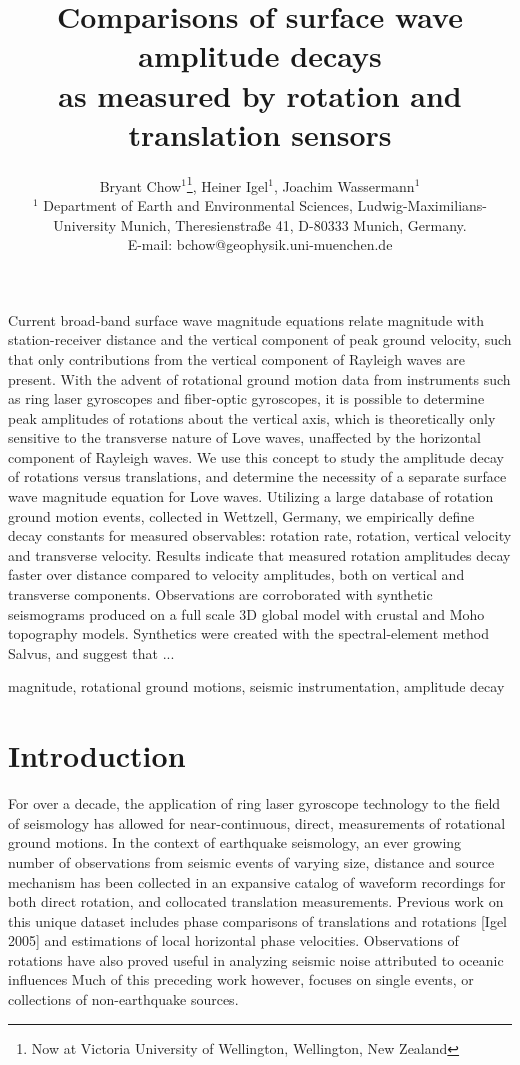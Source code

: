 \documentclass{gji}
\title[Comparisons of surface wave amplitude decays]
  {Comparisons of surface wave amplitude decays \\as measured by rotation and translation sensors}
\author[Bryant Chow]
  {Bryant Chow$^1$\thanks{Now at Victoria University of Wellington, Wellington, New Zealand}, Heiner Igel$^1$, Joachim Wassermann$^1$ \\
  $^1$ Department of Earth and Environmental Sciences, Ludwig-Maximilians-University Munich, Theresienstra\ss e 41, D-80333 Munich, Germany. \\E-mail: bchow@geophysik.uni-muenchen.de
  }
\date{}
\begin{document}
\label{firstpage}

\maketitle

\begin{summary}
Current broad-band surface wave magnitude equations relate magnitude with station-receiver distance and the vertical component of peak ground velocity, such that only contributions from the vertical component of Rayleigh waves are present. With the advent of rotational ground motion data from instruments such as ring laser gyroscopes and fiber-optic gyroscopes, it is possible to determine peak amplitudes of rotations about the vertical axis, which is theoretically only sensitive to the transverse nature of Love waves, unaffected by the horizontal component of Rayleigh waves. We use this concept to study the amplitude decay of rotations versus translations, and determine the necessity of a separate surface wave magnitude equation for Love waves. Utilizing a large database of rotation ground motion events, collected in Wettzell, Germany, we empirically define decay constants for measured observables: rotation rate, rotation, vertical velocity and transverse velocity. Results indicate that measured rotation amplitudes decay faster over distance compared to velocity amplitudes, both on vertical and transverse components. Observations are corroborated with synthetic seismograms produced on a full scale 3D global model with crustal and Moho topography models. Synthetics were created with the spectral-element method Salvus, and suggest that ...
\end{summary}

\begin{keywords}
magnitude, rotational ground motions, seismic instrumentation, amplitude decay
\end{keywords}

\section{Introduction} 
For over a decade, the application of ring laser gyroscope technology to the field of seismology has allowed for near-continuous, direct, measurements of rotational ground motions. In the context of earthquake seismology, an ever growing number of observations from seismic events of varying size, distance and source mechanism has been collected in an expansive catalog of waveform recordings for both direct rotation, and collocated translation measurements.
Previous work on this unique dataset includes phase comparisons of translations and rotations [Igel 2005] %
and estimations of local horizontal phase velocities. %
Observations of rotations have also proved useful in analyzing seismic noise attributed to oceanic influences %
Much of this preceding work however, focuses on single events, or collections of non-earthquake sources. 
\end{document}
